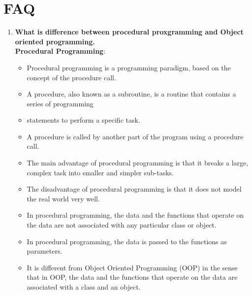 \documentclass[11pt]{article}
\begin{document}
\clearpage

\section{FAQ}
\begin{enumerate}
	\item \textbf{What is difference between procedural proxgramming and Object oriented programming.}\\

	      \textbf{Procedural Programming}:
	      \begin{itemize}
		      \item Procedural programming is a programming paradigm, based on the concept of the procedure call.
		      \item  A procedure, also known as a subroutine, is a routine that contains a series of programming
		      \item  statements to perform a specific task.
		      \item  A procedure is called by another part of the program using a procedure call.
		      \item  The main advantage of procedural programming is that it breaks a large, complex task into smaller and simpler sub-tasks.
		      \item  The disadvantage of procedural programming is that it does not model the real world very well.
		      \item  In procedural programming, the data and the functions that operate on the data are not associated with any particular class or object.
		      \item  In procedural programming, the data is passed to the functions as parameters.
		      \item  It is different from Object Oriented Programming (OOP) in the sense that in OOP, the data and the functions that operate on the data are associated with a class and an object.
	      \end{itemize}


\end{enumerate}
\end{document}
